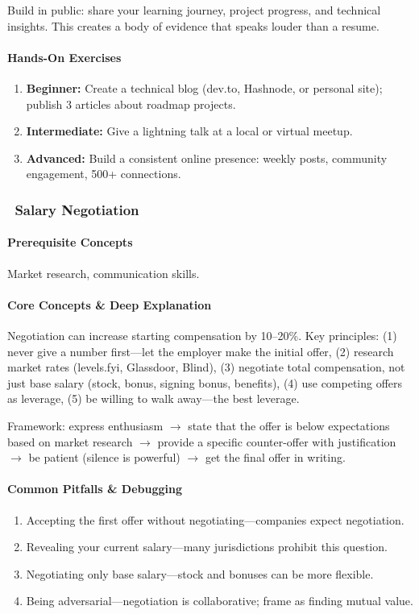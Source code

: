 \documentclass[11pt, a4paper, oneside]{report}
\newcommand{\mustmaster}[1]{\subsubsection{\texorpdfstring{\fcolorbox{blue!40!black}{blue!8}{\footnotesize\bfseries\color{blue!40!black} MUST MASTER}~#1}{#1}}}
\newcommand{\arrow}{$\rightarrow$}
\begin{document}
Build in public: share your learning journey, project progress, and technical insights. This creates a body of evidence that speaks louder than a resume.

\paragraph{Hands-On Exercises}
\begin{enumerate}[leftmargin=*]
\item \textbf{Beginner:} Create a technical blog (dev.to, Hashnode, or personal site); publish 3 articles about roadmap projects.
\item \textbf{Intermediate:} Give a lightning talk at a local or virtual meetup.
\item \textbf{Advanced:} Build a consistent online presence: weekly posts, community engagement, 500+ connections.
\end{enumerate}

\mustmaster{Salary Negotiation}

\paragraph{Prerequisite Concepts} Market research, communication skills.

\paragraph{Core Concepts \& Deep Explanation} Negotiation can increase starting compensation by 10--20\%. Key principles: (1) never give a number first---let the employer make the initial offer, (2) research market rates (levels.fyi, Glassdoor, Blind), (3) negotiate total compensation, not just base salary (stock, bonus, signing bonus, benefits), (4) use competing offers as leverage, (5) be willing to walk away---the best leverage.

Framework: express enthusiasm \arrow{} state that the offer is below expectations based on market research \arrow{} provide a specific counter-offer with justification \arrow{} be patient (silence is powerful) \arrow{} get the final offer in writing.

\paragraph{Common Pitfalls \& Debugging}
\begin{enumerate}[leftmargin=*]
\item Accepting the first offer without negotiating---companies expect negotiation.
\item Revealing your current salary---many jurisdictions prohibit this question.
\item Negotiating only base salary---stock and bonuses can be more flexible.
\item Being adversarial---negotiation is collaborative; frame as finding mutual value.
\end{enumerate}
\end{document}
